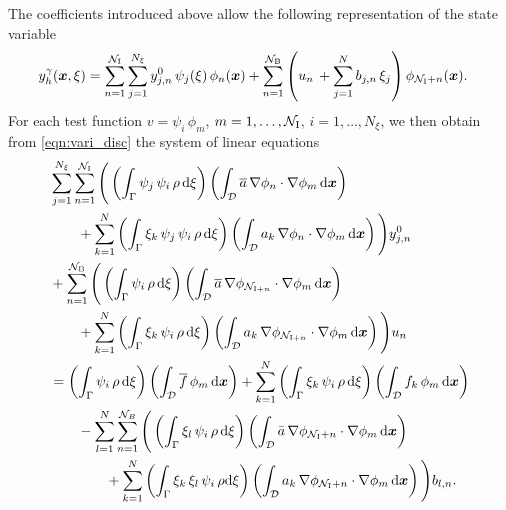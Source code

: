 \documentclass[a4paper,10pt]{article}
\newcommand{\bx}{{\boldsymbol{x}}}
\newcommand{\cD}{{\mathcal{D}}}
\newcommand{\N}{{\mathcal{N}}}
\renewcommand{\d}{\textup{d}}
\numberwithin{theorem}{section}
\begin{document}
The coefficients introduced above allow the following representation of the state variable
\begin{align}\label{eq:ansatz_discrete_state}
  y_h^\gamma(\bx,\xi)
	&=
  \sum_{n=1}^{\N_{\text{I}}}\sum_{j=1}^{N_{\xi}}  y_{j,n}^0\,\psi_j(\xi)\,\phi_n(\boldsymbol{x})
  + \sum_{n=1}^{\N_{\text{B}}} \left(u_n\, 
  + \sum_{j=1}^N  b_{j,n}\,\xi_j\right)\phi_{\N_{\textup{I}}+n}(\bx).
\end{align}
For each test function $v=\psi_i\,\phi_m$,  $m=1,\ldots,\N_{\textup{I}}$, $i=1,\ldots,N_{\xi}$, we then obtain from \eqref{eqn:vari_disc} the system of linear equations
\begin{align}
  \label{eq:state_eq_ansatz}
 &  \sum_{j=1}^{N_{\xi}}\sum_{n=1}^{\N_{\textup{I}}}\Bigg(\left(\int_\Gamma\psi_j\,\psi_i\,\rho\,\d \xi\right)\left(\int_\cD \overline a\,\nabla\phi_n\cdot\nabla \phi_m\,\d \boldsymbol{x}\right) \nonumber\\
 & \qquad + \sum_{k=1}^N \left(\int_\Gamma\xi_k\,\psi_j\,\psi_i\,\rho\,\d \xi\right)\left(\int_\cD a_k\,\nabla\phi_n\cdot\nabla\phi_m\,\d \boldsymbol{x}\right)\Bigg) y_{j,n}^{0}\nonumber\\
 & +   \sum_{n=1}^{\N_{\textup{B}}}\Bigg(\left(\int_\Gamma\psi_i\,\rho\,\d \xi\right)\left(\int_\cD \overline a\,\nabla\phi_{\N_{\textup{I}+n}}\cdot\nabla \phi_m\,\d \boldsymbol{x}\right) \nonumber\\
 & \qquad  + \sum_{k=1}^N \left(\int_\Gamma\xi_k\,\psi_i\,\rho\,\d \xi\right)\left(\int_\cD a_k\,\nabla\phi_{\N_{\textup{I}+n}} \cdot\nabla\phi_m\,\d \boldsymbol{x}\right)\Bigg) u_n \nonumber\\
 & =\left(\int_\Gamma \psi_i\,\rho\,\d \xi\right) \left(\int_{\cD} \overline f\,\phi_m\,\d \boldsymbol{x}\right)+
     \sum_{k=1}^N \left(\int_\Gamma \xi_k\,\psi_i\,\rho\,\d \xi\right) \left(\int_{\cD} f_k\,\phi_m\,\d \boldsymbol{x}\right) \nonumber\\
 & \qquad
 - \sum_{l=1}^N\sum_{n=1}^{\mathcal{N}_B} \Bigg( \left(\int_\Gamma \xi_l\,\psi_i\,\rho\,\d \xi\right) \left(\int_{\cD} \bar a\,\nabla\phi_{\N_{\textup{I}} +n}\cdot\nabla\phi_m \,\d \boldsymbol{x}\right) \nonumber \\
 &\qquad\qquad + \sum_{k=1}^N \left(\int_{\Gamma} \xi_k\,\xi_l\,\psi_i\,\rho\d \xi\right) \left(\int_{\cD} a_k\,\nabla\phi_{\N_{\textup{I}} +n}\cdot\nabla\phi_m\,\d \bx\right) \Bigg)b_{l,n}.
\end{align}
\end{document}
